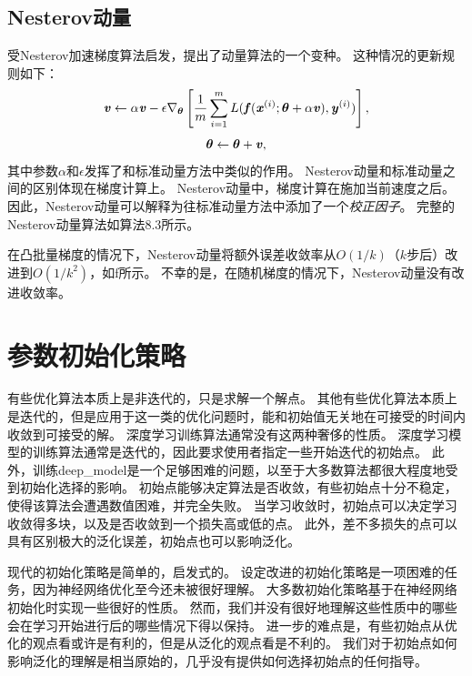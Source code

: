 \subsection{Nesterov动量}
\label{sec:nesterov_momentum}
受Nesterov加速梯度算法\citep{Nesterov83b,Nesterov03}启发，\cite{sutskeverimportance}提出了动量算法的一个变种。
这种情况的更新规则如下：
\begin{equation}
    \boldsymbol{\mathit{v}} \leftarrow \alpha\boldsymbol{\mathit{v}} - \epsilon \nabla_{\boldsymbol{\theta}} \left[
    \frac{1}{m} \sum_{i=1}^m L( \boldsymbol{\mathit{f}}(\boldsymbol{\mathit{x}}^{(i)}; \boldsymbol{\theta} + \alpha \boldsymbol{\mathit{v}}), \boldsymbol{\mathit{y}}^{(i)} )
 \right],
\end{equation}
\begin{equation}
    \boldsymbol{\theta} \leftarrow \boldsymbol{\theta} + \boldsymbol{\mathit{v}} ,
\end{equation}
其中参数$\alpha$和$\epsilon$发挥了和标准动量方法中类似的作用。 
Nesterov动量和标准动量之间的区别体现在梯度计算上。
Nesterov动量中，梯度计算在施加当前速度之后。
因此，Nesterov动量可以解释为往标准动量方法中添加了一个\emph{校正因子}。
完整的Nesterov动量算法如算法8.3所示。


在凸批量梯度的情况下，Nesterov动量将额外误差收敛率从$O(1/k)$（$k$步后）改进到$O(1/k^2)$，如\cite{Nesterov83b}f所示。
不幸的是，在随机梯度的情况下，Nesterov动量没有改进收敛率。

\section{参数初始化策略}
\label{sec:parameter_initialization_strategies}
有些优化算法本质上是非迭代的，只是求解一个解点。
其他有些优化算法本质上是迭代的，但是应用于这一类的优化问题时，能和初始值无关地在可接受的时间内收敛到可接受的解。
深度学习训练算法通常没有这两种奢侈的性质。
深度学习模型的训练算法通常是迭代的，因此要求使用者指定一些开始迭代的初始点。
此外，训练\gls{deep_model}是一个足够困难的问题，以至于大多数算法都很大程度地受到初始化选择的影响。
初始点能够决定算法是否收敛，有些初始点十分不稳定，使得该算法会遭遇数值困难，并完全失败。
当学习收敛时，初始点可以决定学习收敛得多块，以及是否收敛到一个损失高或低的点。
此外，差不多损失的点可以具有区别极大的泛化误差，初始点也可以影响泛化。


现代的初始化策略是简单的，启发式的。
设定改进的初始化策略是一项困难的任务，因为神经网络优化至今还未被很好理解。
大多数初始化策略基于在神经网络初始化时实现一些很好的性质。
然而，我们并没有很好地理解这些性质中的哪些会在学习开始进行后的哪些情况下得以保持。
进一步的难点是，有些初始点从优化的观点看或许是有利的，但是从泛化的观点看是不利的。
我们对于初始点如何影响泛化的理解是相当原始的，几乎没有提供如何选择初始点的任何指导。

